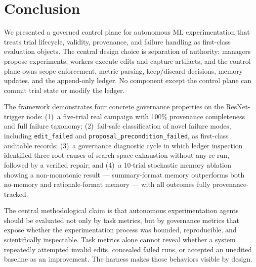 \documentclass[sigconf]{acmart}
\begin{document}

\maketitle








\section{Conclusion}
\label{sec:conclusion}

We presented a governed control plane for autonomous ML experimentation that
treats trial lifecycle, validity, provenance, and failure handling as
first-class evaluation objects. The central design choice is separation of
authority: managers propose experiments, workers execute edits and capture
artifacts, and the control plane owns scope enforcement, metric parsing,
keep/discard decisions, memory updates, and the append-only ledger. No
component except the control plane can commit trial state or modify the
ledger.

The framework demonstrates four concrete governance properties on the
ResNet-trigger node: (1)~a five-trial real campaign with 100\% provenance
completeness and full failure taxonomy; (2)~fail-safe classification of novel
failure modes, including \texttt{edit\_failed} and
\texttt{proposal\_precondition\_failed}, as first-class auditable records;
(3)~a governance diagnostic cycle in which ledger inspection identified three
root causes of search-space exhaustion without any re-run, followed by a
verified repair; and (4)~a 10-trial stochastic memory ablation showing a
non-monotonic result --- summary-format memory outperforms both no-memory and
rationale-format memory --- with all outcomes fully provenance-tracked.

The central methodological claim is that autonomous experimentation agents
should be evaluated not only by task metrics, but by governance metrics that
expose whether the experimentation process was bounded, reproducible, and
scientifically inspectable. Task metrics alone cannot reveal whether a system
repeatedly attempted invalid edits, concealed failed runs, or accepted an
unedited baseline as an improvement. The harness makes those behaviors visible
by design.



\end{document}
